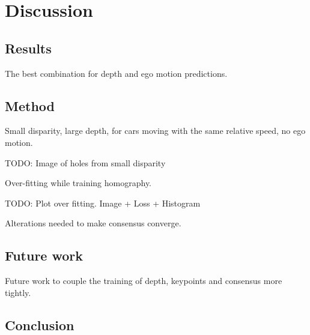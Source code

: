 \chapter{Discussion}\label{cha:discussion}

\section{Results}
The best combination for depth and ego motion predictions.

\section{Method}

Small disparity, large depth, for cars moving with the same relative speed, no ego motion.

TODO: Image of holes from small disparity

Over-fitting while training homography.

TODO: Plot over fitting. Image + Loss + Histogram

Alterations needed to make consensus converge.

\section{Future work}

Future work to couple the training of depth, keypoints and consensus more tightly.

\section{Conclusion}